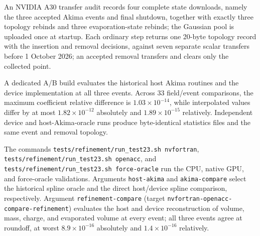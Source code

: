 An NVIDIA A30 transfer audit records four complete state downloads, namely
the three accepted Akima events and final shutdown, together with exactly
three topology rebinds and three evaporation-state rebinds; the Gaussian pool
is uploaded once at startup.  Each ordinary step returns one 20-byte topology
record with the insertion and removal decisions, against seven separate
scalar transfers before 1 October 2026; an accepted removal transfers and
clears only the collected point.

A dedicated A/B build evaluates the historical host Akima routines and the
device implementation at all three events. Across 33 field/event comparisons,
the maximum coefficient relative difference is $1.03\times10^{-14}$, while
interpolated values differ by at most $1.82\times10^{-12}$ absolutely and
$1.89\times10^{-15}$ relatively. Independent device and host-Akima-oracle
runs produce byte-identical statistics files and the same event and removal
topology.

The commands
\texttt{tests/refinement/run\_test23.sh nvfortran},
\texttt{tests/refinement/run\_test23.sh openacc}, and
\texttt{tests/refinement/run\_test23.sh force-oracle} run the CPU, native GPU,
and force-oracle validations. Arguments \texttt{host-akima} and
\texttt{akima-compare} select the historical spline oracle and the direct
host/device spline comparison, respectively. Argument
\texttt{refinement-compare} (target
\texttt{nvfortran-openacc-compare-refinement}) evaluates the host and device
reconstruction of volume, mass, charge, and evaporated volume at every
event; all three events agree at roundoff, at worst $8.9\times10^{-16}$
absolutely and $1.4\times10^{-16}$ relatively.
